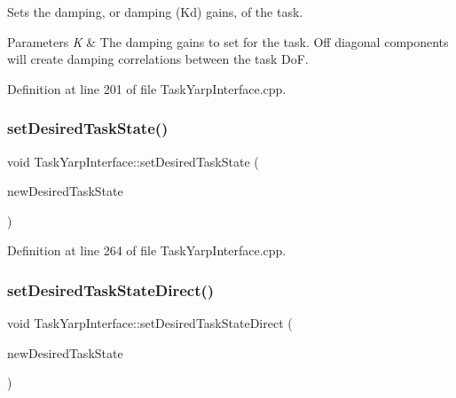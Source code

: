 Sets the damping, or damping (Kd) gains, of the task. 
\begin{DoxyParams}{Parameters}
{\em K} & The damping gains to set for the task. Off diagonal components will create damping correlations between the task DoF. \\
\hline
\end{DoxyParams}


Definition at line 201 of file Task\+Yarp\+Interface.\+cpp.

\hypertarget{classocra_1_1TaskYarpInterface_a9b26a53ccbb968ffe2652e8a22386651}{}\label{classocra_1_1TaskYarpInterface_a9b26a53ccbb968ffe2652e8a22386651} 
\subsubsection{\texorpdfstring{set\+Desired\+Task\+State()}{setDesiredTaskState()}}
{\footnotesize\ttfamily void Task\+Yarp\+Interface\+::set\+Desired\+Task\+State (\begin{DoxyParamCaption}\item[{const \hyperlink{classocra_1_1TaskState}{Task\+State} \&}]{new\+Desired\+Task\+State }\end{DoxyParamCaption})}



Definition at line 264 of file Task\+Yarp\+Interface.\+cpp.

\hypertarget{classocra_1_1TaskYarpInterface_a23efa660fd247e4ac34ff67899291ae8}{}\label{classocra_1_1TaskYarpInterface_a23efa660fd247e4ac34ff67899291ae8} 
\subsubsection{\texorpdfstring{set\+Desired\+Task\+State\+Direct()}{setDesiredTaskStateDirect()}}
{\footnotesize\ttfamily void Task\+Yarp\+Interface\+::set\+Desired\+Task\+State\+Direct (\begin{DoxyParamCaption}\item[{const \hyperlink{classocra_1_1TaskState}{Task\+State} \&}]{new\+Desired\+Task\+State }\end{DoxyParamCaption})}



